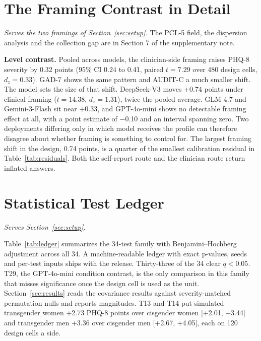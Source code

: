 \documentclass[wcp]{jmlr}
\begin{document}
\section{The Framing Contrast in Detail}
\label{app:framing}
\noindent\emph{Serves the two framings of Section~\ref{sec:setup}.} The PCL-5 field, the dispersion analysis and the collection gap are in Section 7 of the supplementary note.

\textbf{Level contrast.} Pooled across models, the clinician-side framing raises PHQ-8 severity by 0.32 points (95\% CI 0.24 to 0.41, paired $t = 7.29$ over 480 design cells, $d_z = 0.33$). GAD-7 shows the same pattern and AUDIT-C a much smaller shift. The model sets the size of that shift. DeepSeek-V3 moves +0.74 points under clinical framing ($t = 14.38$, $d_z = 1.31$), twice the pooled average. GLM-4.7 and Gemini-3-Flash sit near +0.33, and GPT-4o-mini shows no detectable framing effect at all, with a point estimate of $-$0.10 and an interval spanning zero. Two deployments differing only in which model receives the profile can therefore disagree about whether framing is something to control for. The largest framing shift in the design, 0.74 points, is a quarter of the smallest calibration residual in Table~\ref{tab:residuals}. Both the self-report route and the clinician route return inflated answers.

\section{Statistical Test Ledger}
\label{app:ledger}
\noindent\emph{Serves Section~\ref{sec:setup}.}

Table~\ref{tab:ledger} summarizes the 34-test family with Benjamini--Hochberg adjustment across
all 34. A machine-readable ledger with exact p-values, seeds and per-test inputs ships with the release. Thirty-three of the 34 clear $q < 0.05$. T29, the GPT-4o-mini condition contrast, is the only comparison in this family that misses significance once the design cell is used as the unit. Section~\ref{sec:results} reads the covariance results against severity-matched permutation nulls and reports magnitudes. T13 and T14 put simulated transgender women +2.73 PHQ-8 points over cisgender women [+2.01, +3.44] and transgender men +3.36 over cisgender men [+2.67, +4.05], each on 120 design cells a side.
\end{document}
